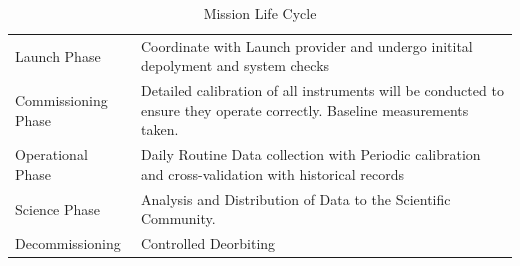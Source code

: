 \begin{table}
    \centering
    \begin{tabular}{p{0.25\linewidth} | p{0.75\linewidth}}
         Launch Phase& Coordinate with Launch provider and undergo initital depolyment and system checks\\
         Commissioning Phase& Detailed calibration of all instruments will be conducted to ensure they operate correctly. Baseline measurements taken.\\
         Operational Phase& Daily Routine Data collection with Periodic calibration and cross-validation with historical records\\
         Science Phase& Analysis and Distribution of Data to the Scientific Community.\\
         Decommissioning& Controlled Deorbiting\\
    \end{tabular}
    \caption{Mission Life Cycle}
    \label{tab:my_label}
\end{table}